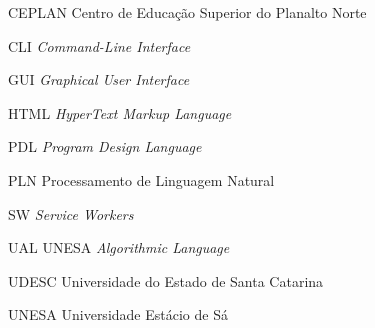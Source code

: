 
\begin{siglas}
  \item[CEPLAN] Centro de Educação Superior do Planalto Norte
  \item[CLI] \textit{Command-Line Interface}
  \item[GUI] \textit{Graphical User Interface}
  \item[HTML] \textit{HyperText Markup Language}
  \item[PDL] \textit{Program Design Language}
  \item[PLN] Processamento de Linguagem Natural
  \item[SW] \textit{Service Workers}
  \item[UAL] UNESA \textit{Algorithmic Language}
  \item[UDESC] Universidade do Estado de Santa Catarina
  \item[UNESA] Universidade Estácio de Sá
\end{siglas}
